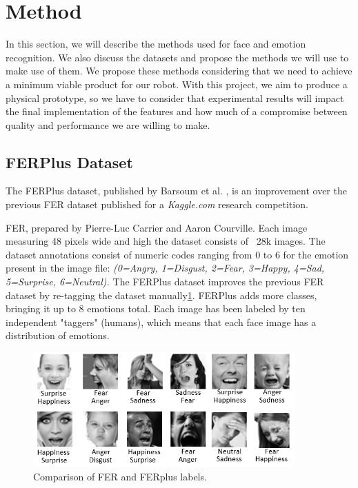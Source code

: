 
\section{Method}
In this section, we will describe the methods used for face and emotion recognition. We also discuss the datasets and propose the methods we will use to make use of them. We propose these methods considering that we need to achieve a minimum viable product for our robot. With this project, we aim to produce a physical prototype, so we have to consider that experimental results will impact the final implementation of the features and how much of a compromise between quality and performance we are willing to make. 



\subsection{FERPlus Dataset}

The FERPlus dataset, published by Barsoum et al. \cite{BarsoumICMI2016}, is an improvement over the previous FER\cite{FER2013} dataset published for a \emph{Kaggle.com} research competition.

FER, prepared by Pierre-Luc Carrier and Aaron Courville. Each image measuring 48 pixels wide and high the dataset consists of ~28k images. The dataset annotations consist of numeric codes ranging from 0 to 6 for the emotion present in the image file: \emph{(0=Angry, 1=Disgust, 2=Fear, 3=Happy, 4=Sad, 5=Surprise, 6=Neutral).}
The FERPlus dataset improves the previous FER dataset by re-tagging the dataset manually\ref{fig:fervsferplus}. FERPlus adds more classes, bringing it up to 8 emotions total. Each image has been labeled by ten independent "taggers" (humans), which means that each face image has a distribution of emotions.



\begin{figure}[h]
  \centering
  \includegraphics[width=10cm]{resources/fervsferplus.png}
  \caption{Comparison of FER and FERplus labels.}\label{fig:fervsferplus}
\end{figure}


